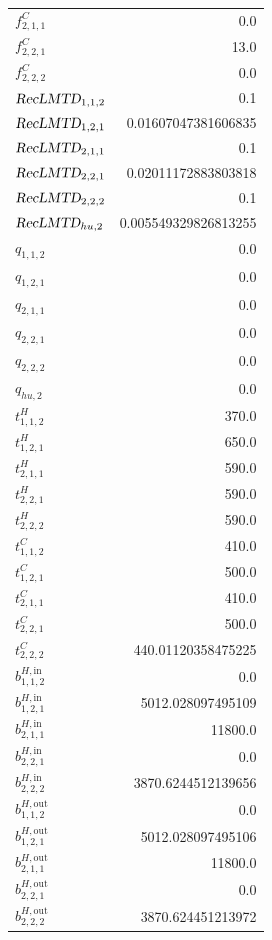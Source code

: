 \documentclass{article}%
\begin{document}
\begin{multicols*}{3}
\begin{supertabular}{lr}
	$f_{2,1,1}^{C}$ & 0.0 \\%
	$f_{2,2,1}^{C}$ & 13.0 \\%
	$f_{2,2,2}^{C}$ & 0.0 \\%
	$\textsl{RecLMTD}_{1,1,2}$ & 0.1 \\%
	$\textsl{RecLMTD}_{1,2,1}$ & 0.01607047381606835 \\%
	$\textsl{RecLMTD}_{2,1,1}$ & 0.1 \\%
	$\textsl{RecLMTD}_{2,2,1}$ & 0.02011172883803818 \\%
	$\textsl{RecLMTD}_{2,2,2}$ & 0.1 \\%
	$\textsl{RecLMTD}_{hu,2}$ & 0.005549329826813255 \\%
	$q_{1,1,2}$ & 0.0 \\%
	$q_{1,2,1}$ & 0.0 \\%
	$q_{2,1,1}$ & 0.0 \\%
	$q_{2,2,1}$ & 0.0 \\%
	$q_{2,2,2}$ & 0.0 \\%
	$q_{hu,2}$ & 0.0 \\%
	$t_{1,1,2}^{H}$ & 370.0 \\%
	$t_{1,2,1}^{H}$ & 650.0 \\%
	$t_{2,1,1}^{H}$ & 590.0 \\%
	$t_{2,2,1}^{H}$ & 590.0 \\%
	$t_{2,2,2}^{H}$ & 590.0 \\%
	$t_{1,1,2}^{C}$ & 410.0 \\%
	$t_{1,2,1}^{C}$ & 500.0 \\%
	$t_{2,1,1}^{C}$ & 410.0 \\%
	$t_{2,2,1}^{C}$ & 500.0 \\%
	$t_{2,2,2}^{C}$ & 440.01120358475225 \\%
	$b_{1,1,2}^{H,\text{in}}$ & 0.0 \\%
	$b_{1,2,1}^{H,\text{in}}$ & 5012.028097495109 \\%
	$b_{2,1,1}^{H,\text{in}}$ & 11800.0 \\%
	$b_{2,2,1}^{H,\text{in}}$ & 0.0 \\%
	$b_{2,2,2}^{H,\text{in}}$ & 3870.6244512139656 \\%
	$b_{1,1,2}^{H,\text{out}}$ & 0.0 \\%
	$b_{1,2,1}^{H,\text{out}}$ & 5012.028097495106 \\%
	$b_{2,1,1}^{H,\text{out}}$ & 11800.0 \\%
	$b_{2,2,1}^{H,\text{out}}$ & 0.0 \\%
	$b_{2,2,2}^{H,\text{out}}$ & 3870.624451213972 \\%

\end{supertabular}
\end{multicols*}
\end{document}
